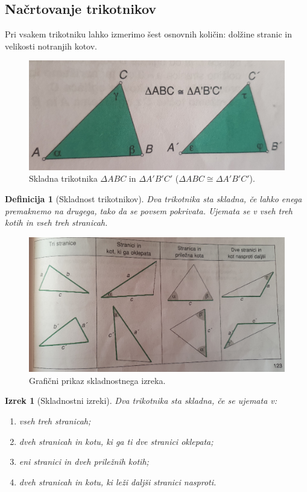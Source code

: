 \documentclass{article}
\newtheorem{definicija}{Definicija}[subsection]
\newtheorem{izrek}{Izrek}[subsection]
\begin{document}
\pagebreak
\subsection{ Načrtovanje trikotnikov }

Pri vsakem trikotniku lahko izmerimo šest osnovnih količin: dolžine stranic in velikosti notranjih kotov.

\begin{figure}[h]
    \includegraphics[width=0.8\linewidth]{skladnaTrikotnika.png}
    \centering
    \caption{Skladna trikotnika $\Delta ABC$ in $\Delta A'B'C'$ ($\Delta ABC \cong \Delta A'B'C'$).}
\end{figure}

\begin{definicija}[Skladnost trikotnikov]
    Dva trikotnika sta skladna, če lahko enega premaknemo na drugega, tako da se povsem pokrivata. Ujemata se v vseh treh kotih in vseh treh stranicah.
\end{definicija}

\begin{figure}[h]
    \includegraphics[width=0.8\linewidth]{skladnostniIzrek.png}
    \centering
    \caption{Grafični prikaz skladnostnega izreka.}
\end{figure}

\begin{izrek}[Skladnostni izreki]
    Dva trikotnika sta skladna, če se ujemata v:
    \begin{enumerate}
        \item vseh treh stranicah;
        \item dveh stranicah in kotu, ki ga ti dve stranici oklepata;
        \item eni stranici in dveh priležnih kotih;
        \item dveh stranicah in kotu, ki leži daljši stranici nasproti.
    \end{enumerate}
\end{izrek}
\end{document}
